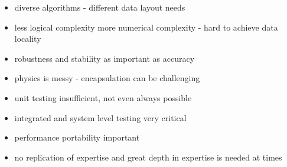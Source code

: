 \begin{itemize}
\item diverse algorithms - different data layout needs
\item less logical complexity more numerical complexity - hard to achieve data locality 
\item robustness and stability as important as accuracy
\item physics is messy - encapsulation can be challenging
\item unit testing insufficient, not even always possible
\item integrated and system level testing very critical
\item performance portability important
\item no replication of expertise and great depth in expertise is needed at times
\end{itemize}

